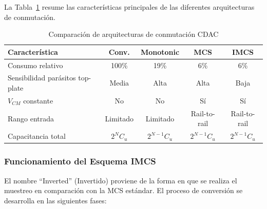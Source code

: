 \documentclass[12pt,a4paper]{report}
\begin{document}
La Tabla~\cref{tab:switching_comparison} resume las características principales de las diferentes arquitecturas de conmutación.

\begin{table}[h]
\centering
\caption{Comparación de arquitecturas de conmutación CDAC}
\label{tab:switching_comparison}
\begin{tabular}{|l|c|c|c|c|}
\hline
\textbf{Característica} & \textbf{Conv.} & \textbf{Monotonic} & \textbf{MCS} & \textbf{IMCS} \\
\hline
Consumo relativo & 100\% & 19\% & 6\% & 6\% \\
Sensibilidad parásitos top-plate & Media & Alta & Alta & Baja \\
$V_{CM}$ constante & No & No & Sí & Sí \\
Rango entrada & Limitado & Limitado & Rail-to-rail & Rail-to-rail \\
Capacitancia total & $2^N C_u$ & $2^{N-1} C_u$ & $2^{N-1} C_u$ & $2^{N-1} C_u$ \\
\hline
\end{tabular}
\end{table}

\subsubsection{Funcionamiento del Esquema IMCS}

El nombre ``Inverted'' (Invertido) proviene de la forma en que se realiza el muestreo en comparación con la MCS estándar. El proceso de conversión se desarrolla en las siguientes fases:
\end{document}
